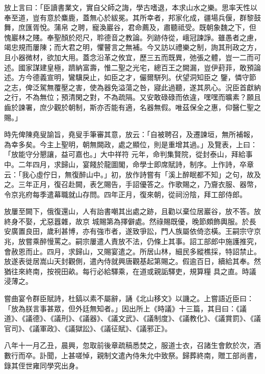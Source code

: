 \begin{pinyinscope}
 放上言曰：「臣讀書業文，實自父師之誨，學古嗜退，本求山水之樂。思率天性以奉至道，豈有意於麋鹿，蓋無心於紱冕。其所幸者，邦家化成，疆場兵偃，群黎鼓舞，庶匯胥悅。蒲帛
 之聘，寵渙巖谷，君命薦及，肅聽祗受。既朝象魏之下，但愧巖林之賤。奉聖顏於咫尺，聆德音之教論。列跡侍從，峨冠諫諍。雖愚者之慮，竭忠規而屢陳；而大君之明，懼瞽言之無補。今又訪以禮樂之制，詢其刑政之方，且小器微材，欲加大用。蓋念沿革之攸宜，歷三五而既異，弛張之體，豈一二而可述。國家謀建皇極，躋納富壽，惟二聖之光宅，總百王之闕漏，豈伊葑菲，敢預論述。方今德義宣明，鸞驥戾止，如臣之才，儼爾駢列。伏望洞知臣之
 鑒，憐守節之志，俾泛駕無覆壓之害，使為器免溢蕩之咎，寢此過聽，遂其夙心。況臣首獻納之行，不為無位；預清閑之對，不為疏隔。又安敢碌碌而依違，嘿嘿而曠素？願且齒於諫署，庶少觀於朝制，斯亦否能有適，名器無假。唯茲保全之惠，仰醫仁聖之賜。」



 時先俾陳堯叟諭旨，堯叟手筆審其意，放云：「自被聘召，及遷諫垣，無所補報，為幸多矣。今主上聖明，朝無闕政，處之顯位，則是重增其過。」及覽表，上曰：「放能守分懇讓，益可嘉也。」大中祥符
 元年，命判集賢院，從封泰山，拜給事中。二年四月，求歸山，宴餞於龍圖閣，命學士即席賦詩，制序。上作詩，卒章云：「我心虛佇日，無復醉山中。」初，放作詩嘗有「溪上醉眠都不知」之句，故及之。三年正月，復召赴闕，表乞賜告，手詔優答之。作歌賜之，乃齎衣服、器幣，令京兆府每季遣幕職就山存問。四年正月，復來朝，從祠汾陰，拜工部侍郎。



 放屢至闕下，俄復還山，人有詒書嘲其出處之跡，且勸以棄位居巖谷，放不答。放終身不娶，尤惡囂雜，故京
 城賜第為擇僻處。然祿賜既優，晚節頗飾輿服。於長安廣置良田，歲利甚博，亦有強市者，遂致爭訟，門人族屬依倚恣橫。王嗣宗守京兆，放嘗乘醉慢罵之。嗣宗屢遣人責放不法，仍條上其事。詔工部郎中施護推究，會赦恩而止。四月，求歸山，又賜宴遣之。所居山林，細民多縱樵採，特詔禁止。放遂表徙居嵩山天封觀側，遣內侍就興唐觀基起第賜之。假逾百日，續給其奉。然猶往來終南，按視田畝。每行必給驛乘，在道或親詬驛吏，規算糧
 具之直。時議浸薄之。



 嘗曲宴令群臣賦詩，杜鎬以素不屬辭，誦《北山移文》以譏之。上嘗語近臣曰：「放為朕言事甚眾，但外廷無知者。」因出所上《時議》十三篇，其目曰：《議道》、《議德》、《議刑》、《議器》、《議文武》、《議制度》、《議教化》、《議賞罰》、《議官司》、《議軍政》、《議獄訟》、《議征賦》、《議邪正》。



 八年十一月乙丑，晨興，忽取前後章疏稿悉焚之，服道士衣，召諸生會飲於次，酒數行而卒。訃聞，上甚嗟悼，親制文遣內侍朱允中致祭。歸葬終南，贈工部尚書，錄其侄世雍同學究出身。




\end{pinyinscope}

